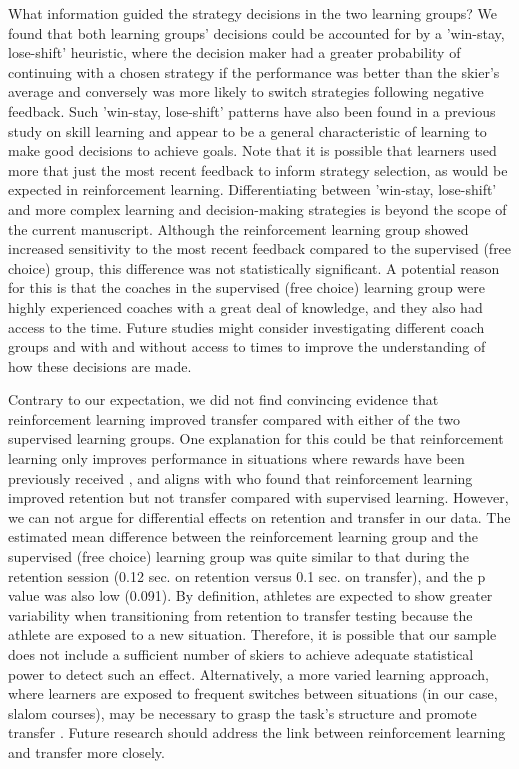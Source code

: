 \documentclass[pdflatex,sn-nature]{sn-jnl}%
\theoremstyle{thmstyleone}%
\theoremstyle{thmstyletwo}%
\theoremstyle{thmstylethree}%
\begin{document}
What information guided the strategy decisions in the two learning groups? We found that both learning groups' decisions could be accounted for by a 'win-stay, lose-shift' heuristic, where the decision maker had a greater probability of continuing with a chosen strategy if the performance was better than the skier's average and conversely was more likely to switch strategies following negative feedback. Such 'win-stay, lose-shift' patterns have also been found in a previous study on skill learning \cite{jordan_a_taylor_explicit_2014} and appear to be a general characteristic of learning to make good decisions to achieve goals. Note that it is possible that learners used more that just the most recent feedback to inform strategy selection, as would be expected in reinforcement learning. Differentiating between 'win-stay, lose-shift' and more complex learning and decision-making strategies is beyond the scope of the current manuscript. Although the reinforcement learning group showed increased sensitivity to the most recent feedback compared to the supervised (free choice) group, this difference was not statistically significant. A potential reason for this is that the coaches in the supervised (free choice) learning group were highly experienced coaches with a great deal of knowledge, and they also had access to the time. Future studies might consider investigating different coach groups and with and without access to times to improve the understanding of how these decisions are made.

Contrary to our expectation, we did not find convincing evidence that reinforcement learning improved transfer compared with either of the two supervised learning groups. One explanation for this could be that reinforcement learning only improves performance in situations where rewards have been previously received \cite{robertson_memory_2018}, and aligns with \citep{hasson_reinforcement_2015} who found that reinforcement learning improved retention but not transfer compared with supervised learning. However, we can not argue for differential effects on retention and transfer in our data. The estimated mean difference between the reinforcement learning group and the supervised (free choice) learning group was quite similar to that during the retention session (0.12 sec. on retention versus 0.1 sec. on transfer), and the p value was also low (0.091). By definition, athletes are expected to show greater variability when transitioning from retention to transfer testing because the athlete are exposed to a new situation. Therefore, it is possible that our sample does not include a sufficient number of skiers to achieve adequate statistical power to detect such an effect. Alternatively, a more varied learning approach, where learners are exposed to frequent switches between situations (in our case, slalom courses), may be necessary to grasp the task's structure and promote transfer \cite{braunStructureLearningAction2010_2, braunStructureLearningSensorimotor2010_1}. Future research should address the link between reinforcement learning and transfer more closely. 
\end{document}
